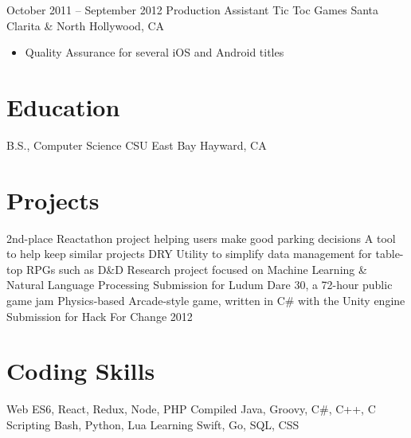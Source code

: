 \documentclass[11pt,a4paper,sans]{moderncv}        %
\begin{document}
\cventry
{October 2011 -- September 2012}	{Production Assistant}
{Tic Toc Games}	{Santa Clarita \& North Hollywood, CA}
{}
{
\begin{itemize}
    \item Quality Assurance for several iOS and Android titles
\end{itemize}
}   %

\section{Education}         %
         {B.S., Computer Science}
        {CSU East Bay}      {Hayward, CA}
        {}                  {}  %

\section{Projects}          %
                      {2nd-place Reactathon project helping users make good parking decisions}
                     {A tool to help keep similar projects DRY}
             {Utility to simplify data management for table-top RPGs such as D\&D}
                      {Research project focused on Machine Learning \& Natural Language Processing}
                  {Submission for Ludum Dare 30, a 72-hour public game jam}
                         {Physics-based Arcade-style game, written in C\# with the Unity engine}
	        {Submission for Hack For Change 2012}

\section{Coding Skills}     %
\cvdoubleitem
{Web}               {ES6, React, Redux, Node, PHP }
{Compiled}          {Java, Groovy, C\#, C++, C}
\cvdoubleitem
{Scripting}         {Bash, Python, Lua}
{Learning}          {Swift, Go, SQL, CSS}
\end{document}
